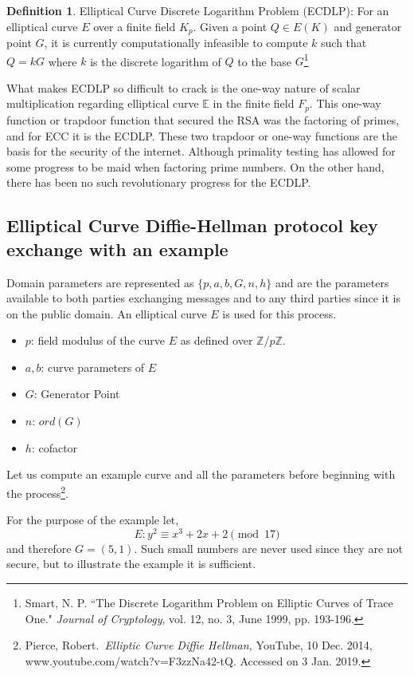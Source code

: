 \documentclass[a4paper,12pt]{article}
\theoremstyle{definition}
\newtheorem{definition}{Definition}
\begin{document}
\begin{definition}{Elliptical Curve Discrete Logarithm Problem (ECDLP):} 
	For an elliptical curve $E$ over a finite field $K_p$. Given a point  $Q \in E(K)$ and generator point $G$, it is currently computationally infeasible to compute $k$ such that $Q=kG$ where $k$ is the discrete logarithm of $Q$ to the base $G$\footnote{Smart, N. P. ``The Discrete Logarithm Problem on Elliptic Curves of Trace One." \textit{Journal of Cryptology}, vol. 12, no. 3, June 1999, pp. 193-196.}
\end{definition}
What makes ECDLP so difficult to crack is the one-way nature of scalar multiplication regarding elliptical curve $\mathbb{E}$ in the finite field $F_p$. This one-way function or trapdoor function that secured the RSA was the factoring of primes, and for ECC it is the ECDLP. These two trapdoor or one-way functions are the basis for the security of the internet. Although primality testing has allowed for some progress to be maid when factoring prime numbers. On the other hand, there has been no such revolutionary progress for the ECDLP.

\subsection{Elliptical Curve Diffie-Hellman protocol key exchange with an example}
Domain parameters are represented as $\{p,a,b,G,n,h\}$ and are the parameters available to both parties exchanging messages and to any third parties since it is on the public domain. An elliptical curve $E$ is used for this process.
\begin{itemize}
	\item $p$: field modulus of the curve $E$ as defined over $\mathbb{Z}/p\mathbb{Z}$.
	\item $a,b$: curve parameters of $E$
	\item $G$: Generator Point
	\item $n$: $ord(G)$
	\item $h$: cofactor
\end{itemize}

Let us compute an example curve and all the parameters before beginning with the process\footnote{Pierce, Robert. \textit{Elliptic Curve Diffie Hellman,} YouTube, 10 Dec. 2014, www.youtube.com/watch?v=F3zzNa42-tQ. Accessed on 3 Jan. 2019.}.

	For the purpose of the example let,
	\begin{equation} \label{sampleellipticalcurve}
		E: y^2 \equiv x^3 +2x+2 \pmod{17}
	\end{equation} and therefore $G=(5,1)$. Such small numbers are never used since they are not secure, but to illustrate the example it  is sufficient.
	
\end{document}
